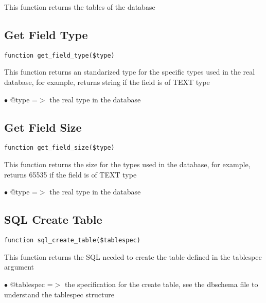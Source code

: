 \documentclass[a4paper]{book}
\begin{document}
This function returns the tables of the database

\hypertarget{toc249}{}
\subsection{Get Field Type}

\begin{lstlisting}
function get_field_type($type)
\end{lstlisting}

This function returns an standarized type for the specific types used in
the real database, for example, returns string if the field is of TEXT type

\begin{compactitem}
\item[\color{myblue}$\bullet$] @type =$>$ the real type in the database
\end{compactitem}

\hypertarget{toc250}{}
\subsection{Get Field Size}

\begin{lstlisting}
function get_field_size($type)
\end{lstlisting}

This function returns the size for the types used in the database, for
example, returns 65535 if the field is of TEXT type

\begin{compactitem}
\item[\color{myblue}$\bullet$] @type =$>$ the real type in the database
\end{compactitem}

\hypertarget{toc251}{}
\subsection{SQL Create Table}

\begin{lstlisting}
function sql_create_table($tablespec)
\end{lstlisting}

This function returns the SQL needed to create the table defined in the
tablespec argument

\begin{compactitem}
\item[\color{myblue}$\bullet$] @tablespec =$>$ the specification for the create table, see the dbschema
              file to understand the tablespec structure
\end{compactitem}
\end{document}
